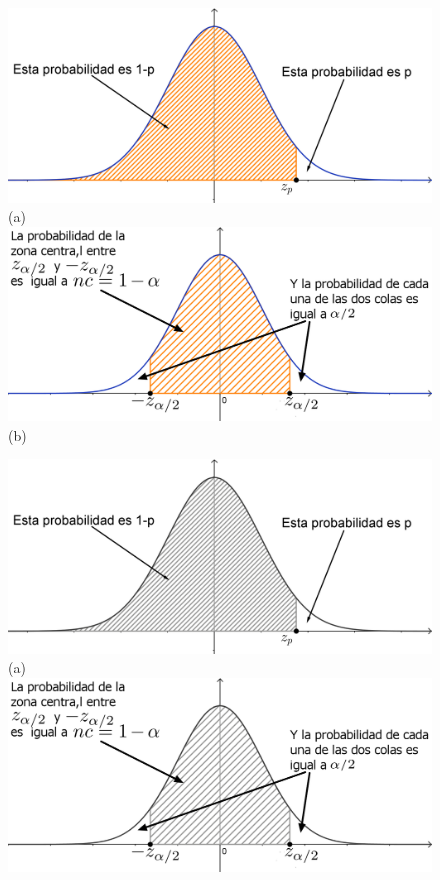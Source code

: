 \begin{figure}[h!]
\begin{center}
\begin{enColor}
\includegraphics[width=13cm]{../fig/Cap06-ValoresCriticosZ.png}\\
(a)\\[5mm]
\includegraphics[width=13cm]{../fig/Cap06-InterpretacionValorCriticoZ.png}\\
(b)
\end{enColor}
\begin{bn}
\includegraphics[width=13cm]{../fig/Cap06-ValoresCriticosZ-bn.png}\\
(a)\\[5mm]
\includegraphics[width=13cm]{../fig/Cap06-InterpretacionValorCriticoZ-bn.png}\\

\end{bn}
\end{center}
\end{figure}
